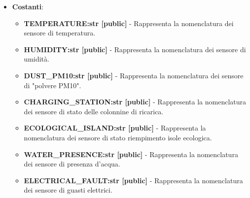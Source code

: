 \begin{itemize}
        \begin{itemize}
            \item \textbf{Costanti}: 
            \begin{itemize}
                \item \textbf{TEMPERATURE:str [public]} - Rappresenta la nomenclatura dei sensore di temperatura.
                \item \textbf{HUMIDITY:str [public]} - Rappresenta la nomenclatura dei sensore di umidità.
                \item \textbf{DUST\_PM10:str [public]} - Rappresenta la nomenclatura dei sensore di "polvere PM10".
                \item \textbf{CHARGING\_STATION:str [public]} - Rappresenta la nomenclatura dei sensore di stato delle colonnine di ricarica.
                \item \textbf{ECOLOGICAL\_ISLAND:str [public]} - Rappresenta la nomenclatura dei sensore di stato riempimento isole ecologica.
                \item \textbf{WATER\_PRESENCE:str [public]} - Rappresenta la nomenclatura dei sensore di presenza d'acqua.
                \item \textbf{ELECTRICAL\_FAULT:str [public]} - Rappresenta la nomenclatura dei sensore di guasti elettrici.
            \end{itemize}


\end{itemize}
\end{itemize}
